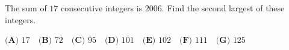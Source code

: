 The sum of $17$ consecutive integers is $2006$. Find the second largest of these integers.

$\textbf{(A) }17\quad\textbf{(B) }72\quad\textbf{(C) }95\quad\textbf{(D) }101\quad\textbf{(E) }102\quad\textbf{(F) }111\quad\textbf{(G) }125$
